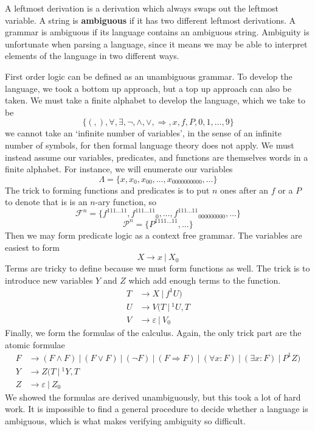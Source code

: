 A leftmost derivation is a derivation which always swaps out the leftmost variable. A string is {\bf ambiguous} if it has two different leftmost derivations. A grammar is ambiguous if its language contains an ambiguous string. Ambiguity is unfortunate when parsing a language, since it means we may be able to interpret elements of the language in two different ways.

\begin{example}
    First order logic can be defined as an unambiguous grammar. To develop the language, we took a bottom up approach, but a top up approach can also be taken. We must take a finite alphabet to develop the language, which we take to be
    \[ \{ (, ), \forall, \exists, \neg, \wedge, \vee, \Rightarrow, x, f, P, 0, 1, \dots, 9 \} \]
    we cannot take an `infinite number of variables', in the sense of an infinite number of symbols, for then formal language theory does not apply. We must instead assume our variables, predicates, and functions are themselves words in a finite alphabet. For instance, we will enumerate our variables
    \[ \Lambda = \{ x, x_0, x_{00}, \dots, x_{0000000000}, \dots \} \]
    The trick to forming functions and predicates is to put $n$ ones after an $f$ or a $P$ to denote that is is an $n$-ary function, so
    \[ \mathcal{F}^n = \{ \left.f^{111 \dots 11}\right., \left.f^{111\dots11}\right._0, \dots, \left.f^{111 \dots 11}\right._{000000000}, \dots \} \]
    \[ \mathcal{P}^n = \{ P^{1111\dots11}, \dots \} \]
    Then we may form predicate logic as a context free grammar. The variables are easiest to form
    \[ X \rightarrow {x}\ |\ {X_0} \]
    Terms are tricky to define because we must form functions as well. The trick is to introduce new variables $Y$ and $Z$ which add enough terms to the function.
    \begin{align*}
        T &\rightarrow {X}\ |\ {f^1U)}\\
        U &\rightarrow {V(T}\ |\ {^1U, T}\\
        V &\rightarrow \varepsilon\ |\ V_0
    \end{align*}
    Finally, we form the formulas of the calculus. Again, the only trick part are the atomic formulae
    \begin{align*}
        F &\rightarrow {(F \wedge F)}\ |\ {(F \vee F)}\ |\ {(\neg F)}\ |\ {(F \Rightarrow F)}\ |\ {(\forall x: F)}\ |\ {(\exists x: F)}\ |\ {P^1Z)}\\
        Y &\rightarrow {Z(T}\ |\ {^1Y, T}\\
        Z &\rightarrow \varepsilon\ |\ Z_0
    \end{align*}
    We showed the formulas are derived unambiguously, but this took a lot of hard work. It is impossible to find a general procedure to decide whether a language is ambiguous, which is what makes verifying ambiguity so difficult.
\end{example}

